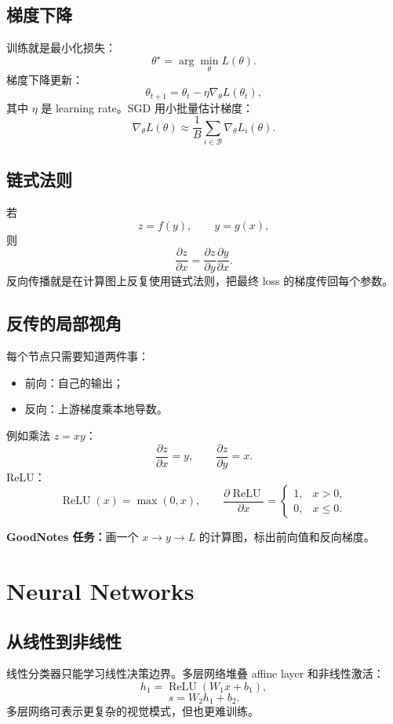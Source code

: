 \documentclass[11pt]{article}
\newcommand{\ReLU}{\operatorname{ReLU}}
\newcommand{\goodnotes}[1]{\textbf{GoodNotes 任务：}#1}
\begin{document}
\subsection{梯度下降}

训练就是最小化损失：
\[
  \theta^\star=\arg\min_\theta L(\theta).
\]
梯度下降更新：
\[
  \theta_{t+1}=\theta_t-\eta\nabla_\theta L(\theta_t),
\]
其中 $\eta$ 是 learning rate。SGD 用小批量估计梯度：
\[
  \nabla_\theta L(\theta)\approx
  \frac{1}{B}\sum_{i\in\mathcal B}\nabla_\theta L_i(\theta).
\]

\subsection{链式法则}

若
\[
  z=f(y),\qquad y=g(x),
\]
则
\[
  \frac{\partial z}{\partial x}
  =
  \frac{\partial z}{\partial y}
  \frac{\partial y}{\partial x}.
\]
反向传播就是在计算图上反复使用链式法则，把最终 loss 的梯度传回每个参数。

\subsection{反传的局部视角}

每个节点只需要知道两件事：
\begin{itemize}
  \item 前向：自己的输出；
  \item 反向：上游梯度乘本地导数。
\end{itemize}
例如乘法 $z=xy$：
\[
  \frac{\partial z}{\partial x}=y,\qquad
  \frac{\partial z}{\partial y}=x.
\]
ReLU：
\[
  \ReLU(x)=\max(0,x),
\qquad
  \frac{\partial \ReLU}{\partial x}=
  \begin{cases}
    1,&x>0,\\
    0,&x\le 0.
  \end{cases}
\]

\goodnotes{画一个 $x\rightarrow y\rightarrow L$ 的计算图，标出前向值和反向梯度。}

\section{Neural Networks}

\subsection{从线性到非线性}

线性分类器只能学习线性决策边界。多层网络堆叠 affine layer 和非线性激活：
\[
  h_1=\ReLU(W_1x+b_1),
\]
\[
  s=W_2h_1+b_2.
\]
多层网络可表示更复杂的视觉模式，但也更难训练。
\end{document}
